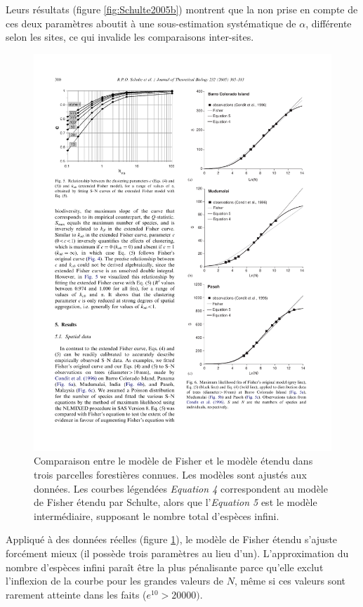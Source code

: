 \documentclass[
  11pt,
  french,
  a4paper,
  extrafontsizes,onecolumn,openright
  ]{memoir}
\begin{document}
\normalsize

Leurs résultats (figure \ref{fig:Schulte2005b}) montrent que la non prise en compte de ces deux paramètres aboutit à une sous-estimation systématique de \(\alpha\), différente selon les sites, ce qui invalide les comparaisons inter-sites.



\scriptsize

\begin{figure}

{\centering \includegraphics[width=0.8\linewidth]{images/Schulte2005a} 

}

\caption{Comparaison entre le modèle de Fisher et le modèle étendu dans trois parcelles forestières connues. Les modèles sont ajustés aux données. Les courbes légendées \emph{Equation 4} correspondent au modèle de Fisher étendu par Schulte, alors que l'\emph{Equation 5} est le modèle intermédiaire, supposant le nombre total d'espèces infini.}\label{fig:Schulte2005a}
\end{figure}

\normalsize

Appliqué à des données réelles (figure \ref{fig:Schulte2005a}), le modèle de Fisher étendu s'ajuste forcément mieux (il possède trois paramètres au lieu d'un).
L'approximation du nombre d'espèces infini paraît être la plus pénalisante parce qu'elle exclut l'inflexion de la courbe pour les grandes valeurs de \(N\), même si ces valeurs sont rarement atteinte dans les faits (\(e^{10}>20000)\).
\end{document}
